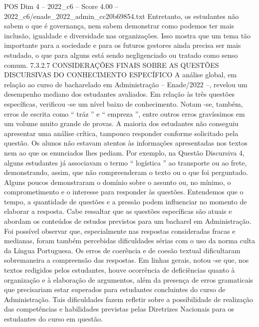 \begin{textsample}{POS Dim 4 – 2022\_c6 – Score 4.00 – 2022\_c6/enade\_2022\_admin\_cc20b69854.txt}
Entretanto, os estudantes não sabem o que é governança, nem sabem demonstrar como podemos ter mais inclusão, igualdade e diversidade nas organizações.
Isso mostra que um tema tão importante para a sociedade e para os futuros gestores ainda precisa ser mais estudado, o que para alguns está sendo negligenciado ou tratado como senso comum. 7.3.2.7 CONSIDERAÇÕES FINAIS SOBRE AS QUESTÕES DISCURSIVAS DO CONHECIMENTO ESPECÍFICO A análise global, em relação ao curso de bacharelado em Administração – Enade/2022 –, revelou um desempenho mediano dos estudantes avaliados.
Em relação às três questões específicas, verificou -se um nível baixo de conhecimento.
Notam -se, também, erros de escrita como “ tráz ” e “ empreza ”, entre outros erros gravíssimos em um volume muito grande de provas.
A maioria dos estudantes não conseguiu apresentar uma análise crítica, tampouco responder conforme solicitado pela questão.
Os alunos não estavam atentos às informações apresentadas nos textos nem ao que os enunciados lhes pediam.
Por exemplo, na Questão Discursiva 4, alguns estudantes já associavam o termo “ logística ” ao transporte ou ao frete, demonstrando, assim, que não compreenderam o texto ou o que foi perguntado.
Alguns poucos demonstraram o domínio sobre o assunto ou, no mínimo, o comprometimento e o interesse para responder às questões.
Entendemos que o tempo, a quantidade de questões e a pressão podem influenciar no momento de elaborar a resposta.
Cabe ressaltar que as questões específicas são atuais e abordam os conteúdos de estudos previstos para um bacharel em Administração.
Foi possível observar que, especialmente nas respostas consideradas fracas e medianas, foram também percebidas dificuldades sérias com o uso da norma culta da Língua Portuguesa.
Os erros de coerência e de coesão textual dificultaram sobremaneira a compreensão das respostas.
Em linhas gerais, notou -se que, nos textos redigidos pelos estudantes, houve ocorrência de deficiências quanto à organização e à elaboração de argumentos, além da presença de erros gramaticais que precisariam estar superados para estudantes concluintes do curso de Administração.
Tais dificuldades fazem refletir sobre a possibilidade de realização das competências e habilidades previstas pelas Diretrizes Nacionais para os estudantes do curso em questão.

\end{textsample}
